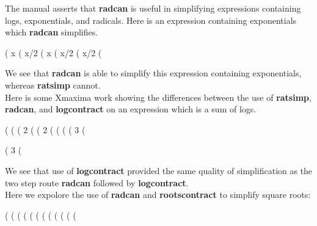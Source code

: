 \documentclass[11pt]{article}
\begin{document}
\noindent The manual asserts that \textbf{radcan} is useful in simplifying
  expressions containing logs, exponentials, and radicals.
Here is an expression containing exponentials which \textbf{radcan} simplifies.
\begin{myVerbatim}
(%
                                      x
(%
                                     x/2
(%
                                      x
(%
                                     x/2
(%
                                     x/2
(%
\end{myVerbatim}
We see that \textbf{radcan} is able to simplify this expression
  containing exponentials, whereas \textbf{ratsimp} cannot.\\

\noindent Here is some Xmaxima work showing the differences between
  the use of \textbf{ratsimp}, \textbf{radcan}, and \textbf{logcontract}
  on an expression which is a sum of logs.
\begin{myVerbatim}
(%
(%
(%
                                  2
(%
(%
                                  2
(%
(%
(%
(%
                                      3
(%
\end{myVerbatim}
\newpage
\begin{myVerbatim}
(%
                                      3
(%
\end{myVerbatim}
We see that use of \textbf{logcontract} provided the same quality
  of simplification as the two step route \textbf{radcan} followed by
  \textbf{logcontract}.\\
  
\noindent Here we expolore the use of \textbf{radcan} and
  \textbf{rootscontract} to simplify square roots:
\begin{myVerbatim}
(%
(%
(%
(%
(%
(%
(%
(%
(%
(%
(%
(%
\end{myVerbatim}  
\end{document}
